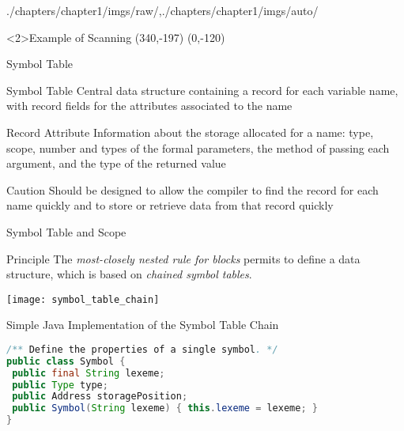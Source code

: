 \begin{graphicspathcontext}{{./chapters/chapter1/imgs/raw/},{./chapters/chapter1/imgs/auto/}}
\begin{bibunit}[apalike]
\begin{frame}<2>{Example of Scanning}
	\putat*(340,-197){}
	\putat(0,-120){}
\end{frame}

\begin{frame}{Symbol Table}
	\begin{definitionblock}{Symbol Table}
		Central data structure containing a record for each variable name, with record fields for the attributes associated to the name
	\end{definitionblock}
	\vspace{.5cm}
	\begin{definitionblock}{Record Attribute}
		Information about the storage allocated for a name: type, scope, number and types of the formal parameters, the method of passing each argument, and the type of the returned value
	\end{definitionblock}
	\vspace{.5cm}
	\begin{alertblock}{Caution}
		Should be designed to allow the compiler to find the record for each name quickly and to store or retrieve data from that record quickly
	\end{alertblock}
\end{frame}

\begin{frame}{Symbol Table and Scope}
	\vspace{.25cm}
	\begin{block}{Principle}
		The \emph{most-closely nested rule for blocks} permits to define a data structure, which is based on \emph{chained symbol tables}.
	\end{block}
	\begin{center}
		\texttt{[image: symbol\_table\_chain]}
	\end{center}
\end{frame}

\begin{frame}[t,fragile]{{Simple Java Implementation} of the Symbol Table Chain}
	\begin{lstlisting}[language=java,basicstyle=\normalcolor\smaller\smaller]
/** Define the properties of a single symbol. */
public class Symbol {
 public final String lexeme;
 public Type type;
 public Address storagePosition;
 public Symbol(String lexeme) { this.lexeme = lexeme; }
}


\end{lstlisting}
\end{frame}
\end{bibunit}
\end{graphicspathcontext}
